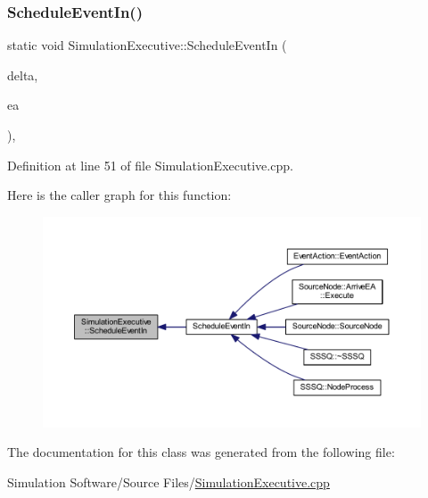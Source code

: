 \subsubsection{\texorpdfstring{Schedule\+Event\+In()}{ScheduleEventIn()}}
{\footnotesize\ttfamily static void Simulation\+Executive\+::\+Schedule\+Event\+In (\begin{DoxyParamCaption}\item[{\hyperlink{_simulation_executive_8h_ac2d3e0ba793497bcca555c7c2cf64ff3}{Time}}]{delta,  }\item[{\hyperlink{class_event_action}{Event\+Action} $\ast$}]{ea }\end{DoxyParamCaption})\hspace{0.3cm}{\ttfamily [inline]}, {\ttfamily [static]}}



Definition at line 51 of file Simulation\+Executive.\+cpp.

Here is the caller graph for this function\+:
\nopagebreak
\begin{figure}[H]
\begin{center}
\leavevmode
\includegraphics[width=350pt]{class_simulation_executive_ac3d1456a2f8384c22e0fce64741eaba0_icgraph}
\end{center}
\end{figure}


The documentation for this class was generated from the following file\+:\begin{DoxyCompactItemize}
\item 
Simulation Software/\+Source Files/\hyperlink{_simulation_executive_8cpp}{Simulation\+Executive.\+cpp}\end{DoxyCompactItemize}
